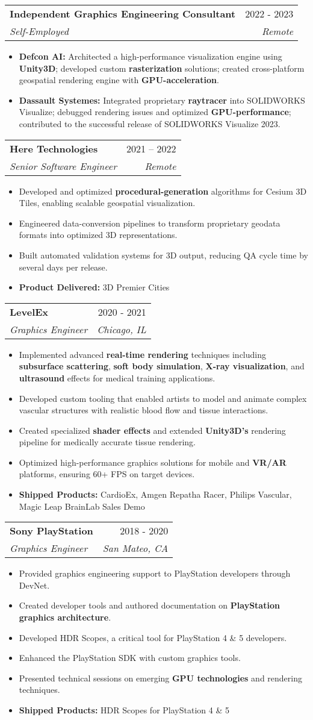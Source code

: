 \documentclass[letterpaper,11pt]{article}
\makeatletter
\newcommand{\resumeItem}[1]{
  \item\small{
    {#1 \vspace{-2pt}}
  }
}
\newcommand{\resumeSubheading}[4]{
  \vspace{-2pt}\item
    \begin{tabular*}{0.97\textwidth}[t]{l@{\extracolsep{\fill}}r}
      \textbf{#1} & #2 \\
      \textit{\small#3} & \textit{\small #4} \\
    \end{tabular*}\vspace{-7pt}
}
\newcommand{\resumeItemListStart}{\begin{itemize}}
\newcommand{\resumeItemListEnd}{\end{itemize}\vspace{-5pt}}
\makeatother
\begin{document}
\resumeSubheading
{Independent Graphics Engineering Consultant}{2022 - 2023}
{Self-Employed}{Remote}
\resumeItemListStart
\resumeItem{\textbf{Defcon AI:} Architected a high-performance visualization engine using \textbf{Unity3D}; developed custom \textbf{rasterization} solutions; created cross-platform geospatial rendering engine with \textbf{GPU-acceleration}.}
\resumeItem{\textbf{Dassault Systemes:} Integrated proprietary \textbf{raytracer} into SOLIDWORKS Visualize; debugged rendering issues and optimized \textbf{GPU-performance}; contributed to the successful release of SOLIDWORKS Visualize 2023.}
\resumeItemListEnd

\resumeSubheading
{Here Technologies}{2021 – 2022}
{Senior Software Engineer}{Remote}
\resumeItemListStart
\resumeItem{Developed and optimized \textbf{procedural-generation} algorithms for Cesium 3D Tiles, enabling scalable geospatial visualization.}
\resumeItem{Engineered data-conversion pipelines to transform proprietary geodata formats into optimized 3D representations.}
\resumeItem{Built automated validation systems for 3D output, reducing QA cycle time by several days per release.}
\resumeItem{\textbf{Product Delivered:} 3D Premier Cities}
\resumeItemListEnd

\resumeSubheading
{LevelEx}{2020 - 2021}
{Graphics Engineer}{Chicago, IL}
\resumeItemListStart
\resumeItem{Implemented advanced \textbf{real-time rendering} techniques including \textbf{subsurface scattering}, \textbf{soft body simulation}, \textbf{X-ray visualization}, and \textbf{ultrasound} effects for medical training applications.}
\resumeItem{Developed custom tooling that enabled artists to model and animate complex vascular structures with realistic blood flow and tissue interactions.}
\resumeItem{Created specialized \textbf{shader effects} and extended \textbf{Unity3D's} rendering pipeline for medically accurate tissue rendering.}
\resumeItem{Optimized high-performance graphics solutions for mobile and \textbf{VR/AR} platforms, ensuring 60+ FPS on target devices.}
\resumeItem{\textbf{Shipped Products:} CardioEx, Amgen Repatha Racer, Philips Vascular, Magic Leap BrainLab Sales Demo}
\resumeItemListEnd

\resumeSubheading
{Sony PlayStation}{2018 - 2020}
{Graphics Engineer}{San Mateo, CA}
\resumeItemListStart
\resumeItem{Provided graphics engineering support to PlayStation developers through DevNet.}
\resumeItem{Created developer tools and authored documentation on \textbf{PlayStation graphics architecture}.}
\resumeItem{Developed HDR Scopes, a critical tool for PlayStation 4 \& 5 developers.}
\resumeItem{Enhanced the PlayStation SDK with custom graphics tools.}
\resumeItem{Presented technical sessions on emerging \textbf{GPU technologies} and rendering techniques.}
\resumeItem{\textbf{Shipped Products:} HDR Scopes for PlayStation 4 \& 5}
\resumeItemListEnd
\end{document}
